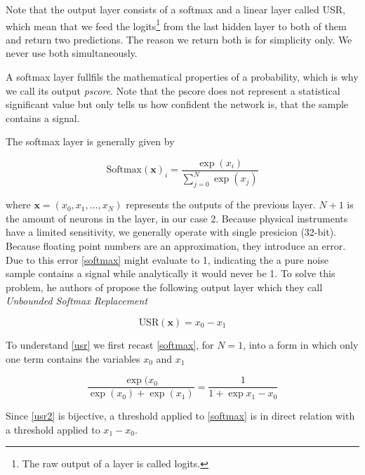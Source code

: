 Note that the output layer consists of a softmax and a linear layer called USR,
which mean that we feed the logits\footnote{The raw output of a layer is called
  logits.} from the last hidden layer to both of them
and return two predictions. The reason we return both is for simplicity only. We
never use both simultaneously.

A softmax layer fullfils the mathematical properties of a probability, which is
why we call its output \textit{pscore}. Note that the pscore does not represent
a statistical significant value but only tells us how confident the network is,
that the sample contains a signal. \cite{PhysRevD.100.063015}

The softmax layer is generally given by \cite{PhysRevD.105.043002}

\begin{equation}\label{softmax}
  \text{Softmax}(\mathbf{x})_i = \frac{\exp(x_i)}{\sum_{j=0}^N \exp(x_j)}
\end{equation}

where $\mathbf{x} = (x_0, x_1, \dots, x_N)$ represents the outputs of the previous
layer. $N+1$ is the amount of neurons in the layer, in our case 2. Because physical instruments
have a limited sensitivity, we generally operate with single presicion (32-bit).
Because floating point numbers are an approximation, they introduce an error.
Due to this error \autoref{softmax} might evaluate to 1, indicating the a
pure noise sample contains a signal while analytically it would never be 1.
\cite{PhysRevD.105.043002} To solve this problem, he authors of
\cite{PhysRevD.105.043002} propose the following output layer which they call
\textit{Unbounded Softmax Replacement} \cite{PhysRevD.105.043002}

\begin{equation}\label{usr}
  \text{USR}(\mathbf{x}) = x_0 - x_1
\end{equation}

To understand \autoref{usr} we first recast \autoref{softmax}, for $N=1$, into
a form in which only one term contains the variables $x_0$ and $x_1$

\begin{equation}\label{usr2}
  \frac{\exp(x_0}{\exp(x_0)+\exp(x_1)} = \frac{1}{1 + \exp{x_1 - x_0}}
\end{equation}

Since \autoref{usr2} is bijective, a threshold applied to \autoref{softmax} is
in direct relation with a threshold applied to $x_1 - x_0$.
\cite{PhysRevD.105.043002}

